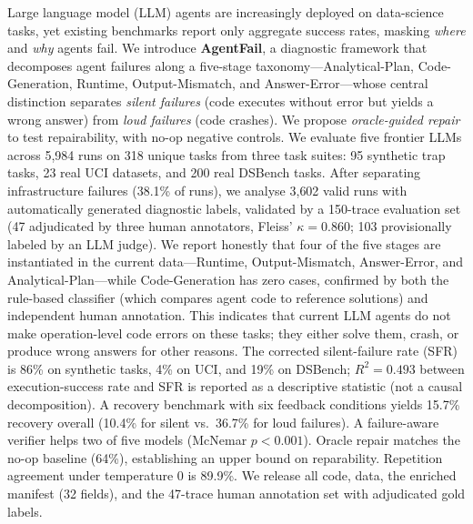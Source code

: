 Large language model (LLM) agents are increasingly deployed on data-science tasks, yet existing benchmarks report only aggregate success rates, masking \emph{where} and \emph{why} agents fail. We introduce \textbf{AgentFail}, a diagnostic framework that decomposes agent failures along a five-stage taxonomy---Analytical-Plan, Code-Generation, Runtime, Output-Mismatch, and Answer-Error---whose central distinction separates \emph{silent failures} (code executes without error but yields a wrong answer) from \emph{loud failures} (code crashes). We propose \emph{oracle-guided repair} to test repairability, with no-op negative controls. We evaluate five frontier LLMs across 5{,}984 runs on 318 unique tasks from three task suites: 95 synthetic trap tasks, 23 real UCI datasets, and 200 real DSBench tasks. After separating infrastructure failures (38.1\% of runs), we analyse 3{,}602 valid runs with automatically generated diagnostic labels, validated by a 150-trace evaluation set (47 adjudicated by three human annotators, Fleiss' $\kappa = 0.860$; 103 provisionally labeled by an LLM judge). We report honestly that four of the five stages are instantiated in the current data---Runtime, Output-Mismatch, Answer-Error, and Analytical-Plan---while Code-Generation has zero cases, confirmed by both the rule-based classifier (which compares agent code to reference solutions) and independent human annotation. This indicates that current LLM agents do not make operation-level code errors on these tasks; they either solve them, crash, or produce wrong answers for other reasons. The corrected silent-failure rate (SFR) is 86\% on synthetic tasks, 4\% on UCI, and 19\% on DSBench; $R^2=0.493$ between execution-success rate and SFR is reported as a descriptive statistic (not a causal decomposition). A recovery benchmark with six feedback conditions yields 15.7\% recovery overall (10.4\% for silent vs.\ 36.7\% for loud failures). A failure-aware verifier helps two of five models (McNemar $p<0.001$). Oracle repair matches the no-op baseline (64\%), establishing an upper bound on reparability. Repetition agreement under temperature 0 is 89.9\%. We release all code, data, the enriched manifest (32 fields), and the 47-trace human annotation set with adjudicated gold labels.
